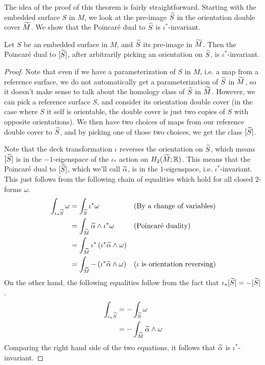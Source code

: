 The idea of the proof of this theorem is fairly straightforward. Starting with the embedded surface
$S$ in $M$, we look at the pre-image $\widetilde{S}$ in the orientation double cover $\widetilde{M}$. We show
that the Poincar\'e dual to $\widetilde{S}$ is $\iota^{\ast}$-invariant.
\begin{lem}
  \label{lem:PD1}
  Let $S$ be an embedded surface in $M$, and $\widetilde{S}$ its pre-image in $\widetilde{M}$. Then the
  Poincar\'e dual to $[\widetilde{S}]$, after arbitrarily picking an orientation on $\widetilde{S}$, is
  $\iota^{\ast}$-invariant.
\end{lem}
\begin{proof}
  Note that even if we have a parameterization of $S$ in $M$, i.e. a map from a reference surface,
  we do not automatically get a parameterization of $\widetilde{S}$ in $\widetilde{M}$, so it doesn't make sense
  to talk about the homology class of $\widetilde{S}$ in $\widetilde{M}$. However, we can pick a reference
  surface $S$, and consider its orientation double cover (in the case where $S$ it self is
  orientable, the double cover is just two copies of $S$ with opposite orientations). We then
  have two choices of maps from our reference double cover to $\widetilde{S}$, and by picking one of
  those two choices, we get the class $[\widetilde{S}]$.

  Note that the deck transformation $\iota$ reverses the orientation on $\widetilde{S}$, which means
  $[\widetilde{S}]$ is in the $-1$-eigenspace of the $\iota_{\ast}$ action on $H_2(\widetilde{M}; \mathbb{R})$. This
  means that the Poincar\'e dual to $[\widetilde{S}]$, which we'll call $\widetilde{\alpha}$, is in the
  $1$-eigenspace, i.e. $\iota^{\ast}$-invariant. This just follows from the following
  chain of equalities which hold for all closed $2$-forms $\omega$.
  \begin{align*}
    \int_{\iota_{\ast}\widetilde{S}} \omega &= \int_{\widetilde{S}} \iota^{\ast}\omega &&\text{(By a change of variables)} \\
                                     &= \int_{\widetilde{M}} \widetilde{\alpha} \wedge \iota^{\ast} \omega &&\text{(Poincar\'e duality)} \\
                                     &=\int_{\widetilde{M}} \iota^{\ast} \left( \iota^{\ast}\widetilde{\alpha} \wedge \omega \right) \\
    &= \int_{\widetilde{M}} - \left( \iota^{\ast} \widetilde{\alpha} \wedge \omega \right) &&\text{($\iota$ is orientation reversing)}
  \end{align*}
  On the other hand, the following equalities follow from the fact that
  $\iota_{\ast}[\widetilde{S}] = -[\widetilde{S}]$.
  \begin{align*}
    \int_{\iota_{\ast}\widetilde{S}} &= - \int_{\widetilde{S}} \omega \\
                              &= - \int_{\widetilde{M}} \widetilde{\alpha} \wedge \omega
  \end{align*}
  Comparing the right hand side of the two equations, it follows that $\widetilde{\alpha}$ is
  $\iota^{\ast}$-invariant.
\end{proof}

